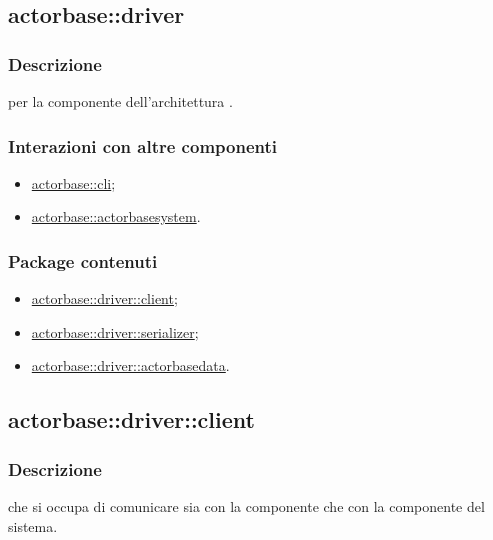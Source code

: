 \documentclass{scalatekids-article}
\begin{document}
\subsection{actorbase::driver}
\label{sec:actorbase::driver}

\subsubsection{Descrizione}

 per la componente  dell'architettura
.

\subsubsection{Interazioni con altre componenti}

\begin{itemize}
\item \hyperref[sec:actorbase::cli]{actorbase::cli};
\item \hyperref[sec:actorbase::actorbasesystem]{actorbase::actorbasesystem}.
\end{itemize}

\subsubsection{Package contenuti}

\begin{itemize}
\item \hyperref[sec:actorbase::driver::client]{actorbase::driver::client};
\item \hyperref[sec:actorbase::driver::serializer]{actorbase::driver::serializer};
\item \hyperref[sec:actorbase::driver::actorbasedata]{actorbase::driver::actorbasedata}.
\end{itemize}

\subsection{actorbase::driver::client}

\subsubsection{Descrizione}

 che si occupa di comunicare sia con la componente 
che con la componente  del sistema.
\end{document}
